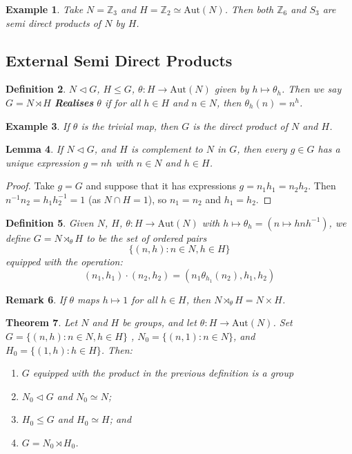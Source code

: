 \documentclass[a4paper,10pt]{article}
\newcommand{\ZZ}{\mathbb{Z}}
\newtheorem{thm}{Theorem}
\newtheorem{Def}[thm]{Definition}
\newtheorem{eg}[thm]{Example}
\newtheorem{Lem}[thm]{Lemma}
\newtheorem{rem}[thm]{Remark}
\begin{document}
\begin{eg}
Take $N = \ZZ_3$ and $H = \ZZ_2 \simeq \text{Aut}(N)$. Then both $\ZZ_6$ and $S_3$ are semi direct products of $N$ by $H$. 
\end{eg}


\subsection{External Semi Direct Products}

\begin{Def}
$N \triangleleft G $, $H \leq G$, $\theta : H \rightarrow \text{Aut}(N)$ given by $h \mapsto \theta_h$. Then we say $G = N \rtimes H$ \textbf{Realises} $\theta$ if for all $h \in H$ and $n \in N$, then $\theta_h (n) = n^h$. 
\end{Def}

\begin{eg}
If $\theta$ is the trivial map, then $G$ is the direct product of $N$ and $H$. 
\end{eg}

\begin{Lem}
If $N \triangleleft G$, and $H$ is complement to $N$ in $G$, then every $g \in G$ has a unique expression $g = nh$ with $n \in N$ and $h \in H$.
\end{Lem}

\begin{proof}
Take $g = G$ and suppose that it has expressions $g = n_1 h_1 = n_2 h_2$. Then $n^{-1} n_2 = h_1 h_2^{-1} = 1$ (as $N \cap H = 1$), so $n_1 = n_2$ and $h_1 = h_2$. 
\end{proof}


\begin{Def}
Given $N$, $H$, $\theta: H \rightarrow \text{Aut}(N)$ with $h \mapsto \theta_h = (n \mapsto h n h^{-1})$, we define $G = N \rtimes_{\theta} H$ to be the set of ordered pairs
\[ \{ (n,h) : n \in N, h \in H \} \]
equipped with the operation:
\[ (n_1, h_1) \cdot (n_2, h_2) = ( n_1 \theta_{h_1} (n_2), h_1, h_2 ) \]
\end{Def}

\begin{rem}
If $\theta$ maps $h \mapsto 1$ for all $h \in H$, then $N \rtimes_{\theta} H = N \times H$. 
\end{rem}

\begin{thm}
Let $N$ and $H$ be groups, and let $\theta : H \rightarrow \text{Aut}(N)$. Set $G = \{ (n,h) : n \in N, h \in H \}$ , $N_0 = \{ (n,1) : n \in N \}$, and $H_0 = \{ (1, h) : h \in H \}$. Then:
\begin{enumerate}
\item $G$ equipped with the product in the previous definition is a group
\item $N_0 \triangleleft G$ and $N_0 \simeq N$; 
\item $H_0 \leq G$ and $H_0 \simeq H$; and
\item $G = N_0 \rtimes H_0$. 
\end{enumerate}

\end{thm}
\end{document}
